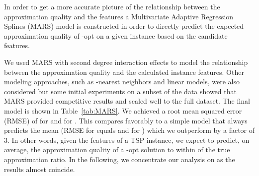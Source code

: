 \documentclass{article}
\begin{document}
In order to get a more accurate picture of the relationship between
the approximation quality and the features a Multivariate Adaptive
Regression Splines (MARS) \cite{Friedman1991} model is constructed in
order to directly predict the expected approximation quality of
-opt on a given instance based on the candidate features.

We used MARS with second degree interaction effects to model the
relationship between the approximation quality and the calculated
instance features. Other modeling approaches, such as -nearest
neighbors and linear models, were also considered but some initial
experiments on a subset of the data showed that MARS provided
competitive results and scaled well to the full dataset. The final
model is shown in Table~\ref{tab:MARS}. We achieved a root mean
squared error (RMSE) of  for  and  for
. This compares favorably to a simple model that always
predicts the mean (RMSE for  equals  and for 
) which we outperform by a factor of 3. In other words,
given the features of a TSP instance, we expect to predict, on
average, the approximation quality of a -opt solution to within
 of the true approximation ratio. In the following, we concentrate our analysis on  as the results almost coincide.
\end{document}
